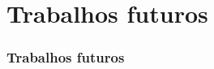 \documentclass{beamer}
\begin{document}
%
%

\section{Trabalhos futuros}
\begin{frame}
\frametitle{Trabalhos futuros}
\end{frame}
\end{document}
